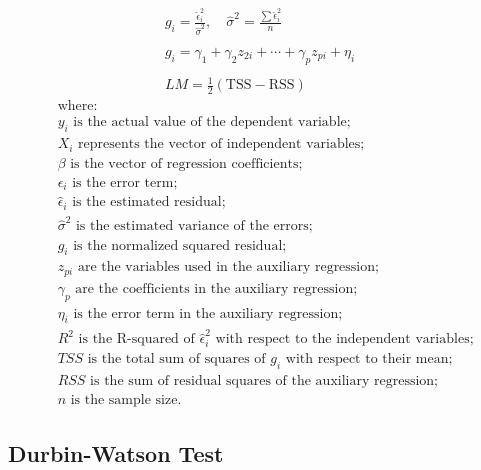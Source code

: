    \begin{equation}
    \label{annexes:equation:breusch-pagan}
    \begin{aligned}
g_i = \frac{\hat{\epsilon}_i^2}{\hat{\sigma}^2}, \quad \hat{\sigma}^2 = \frac{\sum \hat{\epsilon}_i^2}{n}\\\\
g_i = \gamma_1 + \gamma_2 z_{2i} + \cdots + \gamma_p z_{pi} + \eta_i\\\\
LM = \frac{1}{2} (\text{TSS} - \text{RSS})
    \end{aligned}
    \end{equation}
\begin{align*}
    &\text{where:} \\
    &y_i \text{ is the actual value of the dependent variable;} \\
    &X_i \text{ represents the vector of independent variables;} \\
    &\beta \text{ is the vector of regression coefficients;} \\
    &\epsilon_i \text{ is the error term;} \\
    &\hat{\epsilon}_i \text{ is the estimated residual;} \\
    &\hat{\sigma}^2 \text{ is the estimated variance of the errors;} \\
    &g_i \text{ is the normalized squared residual;} \\
    &z_{pi} \text{ are the variables used in the auxiliary regression;} \\
    &\gamma_p \text{ are the coefficients in the auxiliary regression;} \\
    &\eta_i \text{ is the error term in the auxiliary regression;} \\
    &R^2 \text{ is the R-squared of } \hat{\epsilon}_i^2 \text{ with respect to the independent variables;} \\
    &TSS \text{ is the total sum of squares of } g_i \text{ with respect to their mean;} \\
    &RSS \text{ is the sum of residual squares of the auxiliary regression;} \\
    &n \text{ is the sample size.}
\end{align*}

\subsection{Durbin-Watson Test}
    \label{annexes:methodologie-ols-durbin-watson}

